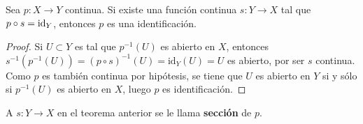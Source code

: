 

\begin{theorem}
Sea $p : X \longrightarrow Y$ continua. Si existe una función continua $s : Y \longrightarrow X$ tal que $p \circ s = \textnormal{id}_Y$, entonces $p$ es una identificación.
\end{theorem}

\begin{proof}
Si $U \subset Y$ es tal que $p^{-1}(U)$ es abierto en $X$, entonces $s^{-1}(p^{-1}(U)) = (p \circ s)^{-1}(U) = \text{id}_Y(U) = U$ es abierto, por ser $s$ continua. Como $p$ es también continua por hipótesis, se tiene que $U$ es abierto en $Y$ si y sólo si $p^{-1}(U)$ es abierto en $X$, luego $p$ es identificación.
\end{proof}

\begin{definition}
A $s : Y \longrightarrow X$ en el teorema anterior se le llama \textbf{sección} de $p$.
\end{definition}
